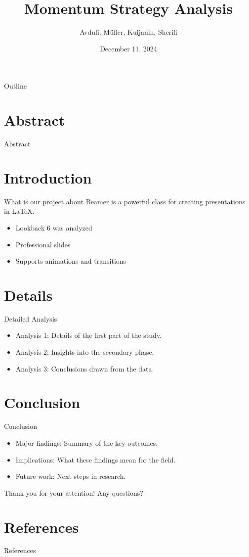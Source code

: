 \documentclass{beamer}
\title{Momentum Strategy Analysis}
\author{Avduli, Müller, Kuljanin, Sherifi}
\date{December 11, 2024}
\institute{University of Zurich}
\begin{document}
\begin{frame}
    \titlepage
\end{frame}

\begin{frame}{Outline}
    \tableofcontents
\end{frame}

\section{Abstract}
\begin{frame}{Abstract}

\end{frame}

\section{Introduction}
\begin{frame}{What is our project about}
    Beamer is a powerful class for creating presentations in LaTeX.
    \begin{itemize}
        \item Lookback 6 was analyzed 
        \item Professional slides
        \item Supports animations and transitions
    \end{itemize}
\end{frame}

\section{Details}
\begin{frame}{Detailed Analysis}
    \begin{itemize}
        \item Analysis 1: Details of the first part of the study.
        \item Analysis 2: Insights into the secondary phase.
        \item Analysis 3: Conclusions drawn from the data.
    \end{itemize}
\end{frame}

\section{Conclusion}
\begin{frame}{Conclusion}
    \begin{itemize}
        \item Major findings: Summary of the key outcomes.
        \item Implications: What these findings mean for the field.
        \item Future work: Next steps in research.
    \end{itemize}
    Thank you for your attention! Any questions?
\end{frame}

\section{References}
\begin{frame}{References}
    \printbibliography
\end{frame}
\end{document}

